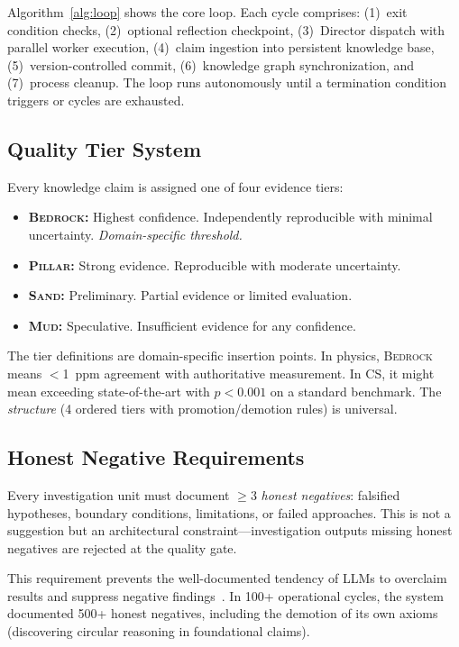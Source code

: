\documentclass[11pt,a4paper]{article}
\newcommand{\bedrock}{\textsc{Bedrock}}
\newcommand{\pillar}{\textsc{Pillar}}
\newcommand{\sand}{\textsc{Sand}}
\newcommand{\mud}{\textsc{Mud}}
\begin{document}
Algorithm~\ref{alg:loop} shows the core loop. Each cycle comprises: (1)~exit condition
checks, (2)~optional reflection checkpoint, (3)~Director dispatch with parallel
worker execution, (4)~claim ingestion into persistent knowledge base,
(5)~version-controlled commit, (6)~knowledge graph synchronization, and
(7)~process cleanup. The loop runs autonomously until a termination condition
triggers or cycles are exhausted.

\subsection{Quality Tier System}
\label{sec:tiers}

Every knowledge claim is assigned one of four evidence tiers:

\begin{itemize}[nosep]
    \item \textbf{\bedrock{}:} Highest confidence. Independently reproducible with
          minimal uncertainty. \emph{Domain-specific threshold.}
    \item \textbf{\pillar{}:} Strong evidence. Reproducible with moderate uncertainty.
    \item \textbf{\sand{}:} Preliminary. Partial evidence or limited evaluation.
    \item \textbf{\mud{}:} Speculative. Insufficient evidence for any confidence.
\end{itemize}

The tier definitions are domain-specific insertion points. In physics, \bedrock{}
means $<$1~ppm agreement with authoritative measurement. In CS, it might mean
exceeding state-of-the-art with $p < 0.001$ on a standard benchmark. The
\emph{structure} (4 ordered tiers with promotion/demotion rules) is universal.

\subsection{Honest Negative Requirements}
\label{sec:honest_neg}

Every investigation unit must document $\geq$3 \emph{honest negatives}: falsified
hypotheses, boundary conditions, limitations, or failed approaches. This is not a
suggestion but an architectural constraint---investigation outputs missing honest
negatives are rejected at the quality gate.

This requirement prevents the well-documented tendency of LLMs to overclaim results
and suppress negative findings~\cite{overclaiming}. In 100+ operational cycles,
the system documented 500+ honest negatives, including the demotion of its own
axioms (discovering circular reasoning in foundational claims).
\end{document}
